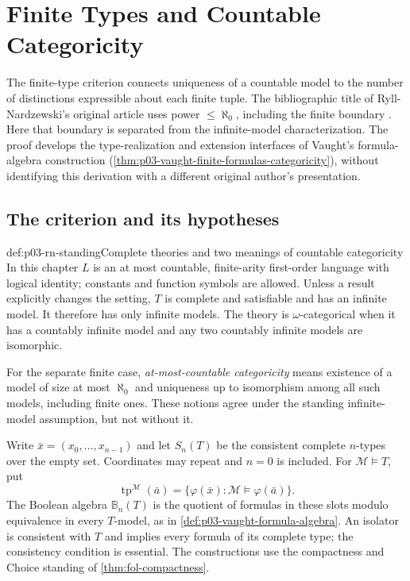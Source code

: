 \section{Finite Types and Countable Categoricity}
\label{sec:p03-n-a-001-01}

The finite-type criterion connects uniqueness of a countable model to
the number of distinctions expressible about each finite tuple.
The bibliographic title of Ryll-Nardzewski's original article uses
power \(\leq\aleph_0\), including the finite boundary
\cite{RyllNardzewski1959}. Here that boundary is separated from
the infinite-model characterization. The proof develops the
type-realization and extension interfaces of Vaught's formula-algebra
construction (\cref{thm:p03-vaught-finite-formulas-categoricity}),
without identifying this derivation with a different original
author's presentation.

\subsection{The criterion and its hypotheses}
\label{sec:p03-rn-criterion}

\begin{hbconvention}{def:p03-rn-standing}{Complete theories and two meanings of countable categoricity}
In this chapter \(L\) is an at most countable, finite-arity first-order
language with logical identity; constants and function symbols are
allowed. Unless a result explicitly changes the setting, \(T\) is
complete and satisfiable and has an infinite model.
It therefore has only infinite models.
The theory is \(\omega\)-categorical when it has a countably infinite
model and any two countably infinite models are isomorphic.

For the separate finite case, \emph{at-most-countable categoricity}
means existence of a model of size at most \(\aleph_0\) and uniqueness
up to isomorphism among all such models, including finite ones.
These notions agree under the standing infinite-model assumption,
but not without it.

Write \(\bar x=(x_0,\ldots,x_{n-1})\) and let \(S_n(T)\) be the
consistent complete \(n\)-types over the empty set.
Coordinates may repeat and \(n=0\) is included. For
\(\mathcal M\models T\), put
\[
 \operatorname{tp}^{\mathcal M}(\bar a)
       =\{\varphi(\bar x):\mathcal M\models\varphi(\bar a)\}.
\]
The Boolean algebra \(\mathbb B_n(T)\) is the quotient of formulas
in these slots modulo equivalence in every \(T\)-model, as in
\cref{def:p03-vaught-formula-algebra}.
An isolator is consistent with \(T\) and implies every formula
of its complete type; the consistency condition is essential.
The constructions use the compactness and Choice standing of
\cref{thm:fol-compactness}.
\end{hbconvention}

